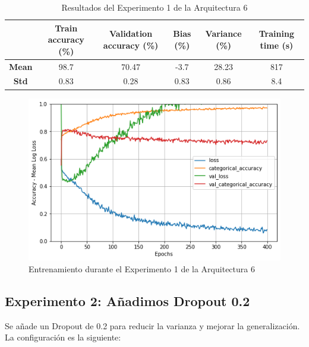 \documentclass{article}
\begin{document}
            \begin{table}[!h]
				\begin{center}
					\begin{tabular}{ c | c | c | c | c | c |}
						\ & \textbf{Train accuracy (\%)} & \textbf{Validation accuracy (\%)} & \textbf{Bias (\%)} & \textbf{Variance (\%)} & \textbf{Training time (s)} \\ \hline
						\textbf{Mean} & 98.7 & 70.47 & -3.7  & 28.23 & 817   \\ \hline
						\textbf{Std} &  0.83 & 0.28 &  0.83 & 0.86 & 8.4  \\ \hline
					\end{tabular}
					\caption{Resultados del Experimento 1 de la Arquitectura 6}
					\label{tab:res-a2-e5}
				\end{center}
			\end{table}
            
            \begin{figure}[!h]
				\begin{center}
					\includegraphics[scale=0.5]{tr-a6-e1.png}		
					\caption{Entrenamiento durante el Experimento 1 de la Arquitectura 6}	
					\label{tab:tr-a6-e1}
				\end{center}
			\end{figure}
   
        \subsection{Experimento 2: A\~{n}adimos Dropout 0.2}
        \label{s-a6-e2}
            Se a\~{n}ade un Dropout de 0.2 para reducir la varianza y mejorar la generalizaci\'on. La configuraci\'on es la siguiente: 
   
\end{document}
